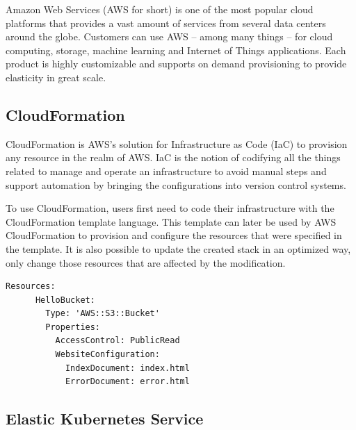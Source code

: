 Amazon Web Services (AWS for short) is one of the most popular cloud platforms that provides a vast amount of services from several data centers around the globe. Customers can use AWS -- among many things -- for cloud computing, storage, machine learning and Internet of Things applications. Each product is highly customizable and supports on demand provisioning to provide elasticity in great scale. \cite{AWSWhatIs}
\subsection{CloudFormation} \label{cloudformation}

CloudFormation is AWS's solution for Infrastructure as Code (IaC) to provision any resource in the realm of AWS. IaC is the notion of codifying all the things related to manage and operate an infrastructure to avoid manual steps and support automation by bringing the configurations into version control systems.

To use CloudFormation, users first need to code their infrastructure with the CloudFormation template language. This template can later be used by AWS CloudFormation to provision and configure the resources that were specified in the template. It is also possible to update the created stack in an optimized way, only change those resources that are affected by the modification.

\vspace{0.5cm}
\begin{minipage}{\linewidth}
	\begin{lstlisting}[caption={Example CloudFormation template of an S3 bucket \cite{AWSCloudFormationExample}}, label={lst:aws-cf-bucket}]
	Resources:
	  HelloBucket:
	    Type: 'AWS::S3::Bucket'
	    Properties:
	      AccessControl: PublicRead
	      WebsiteConfiguration:
	        IndexDocument: index.html
	        ErrorDocument: error.html
	\end{lstlisting}
\end{minipage}

\subsection{Elastic Kubernetes Service}

